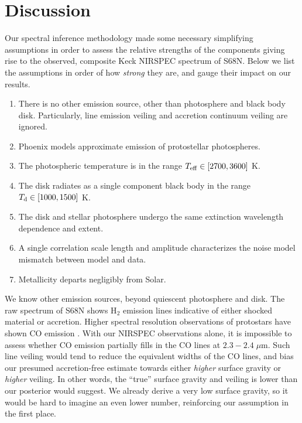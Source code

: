 \documentclass[twocolumn]{emulateapj}%
\begin{document}
\section{Discussion}\label{sec:discussion}

Our spectral inference methodology made some necessary simplifying assumptions in order to assess the relative strengths of the components giving rise to the observed, composite Keck NIRSPEC spectrum of S68N.  Below we list the assumptions in order of how \emph{strong} they are, and gauge their impact on our results.  

\begin{enumerate}
\item There is no other emission source, other than photosphere and black body disk.  Particularly, line emission veiling and accretion continuum veiling are ignored.
\item Phoenix models approximate emission of protostellar photospheres.
\item The photospheric temperature is in the range $T_{\mathrm{eff}} \in [2700,3600]$ K.
\item The disk radiates as a single component black body in the range $T_\textrm{d} \in [1000,1500]$ K.
\item The disk and stellar photosphere undergo the same extinction wavelength dependence and extent.
\item A single correlation scale length and amplitude characterizes the noise model mismatch between model and data.
\item Metallicity departs negligibly from Solar.
\end{enumerate}

We know other emission sources, beyond quiescent photosphere and disk.  The raw spectrum of S68N shows H$_2$ emission lines indicative of either shocked material or accretion.  Higher spectral resolution observations of protostars have shown CO emission \citep{2016ApJ...826..179L}.  With our NIRSPEC observations alone, it is impossible to assess whether CO emission partially fills in the CO lines at $2.3-2.4 \;\mu$m.  Such line veiling would tend to reduce the equivalent widths of the CO lines, and bias our presumed accretion-free estimate towards either \emph{higher} surface gravity or \emph{higher} veiling.  In other words, the ``true'' surface gravity and veiling is lower than our posterior would suggest.  We already derive a very low surface gravity, so it would be hard to imagine an even lower number, reinforcing our assumption in the first place.
\end{document}
